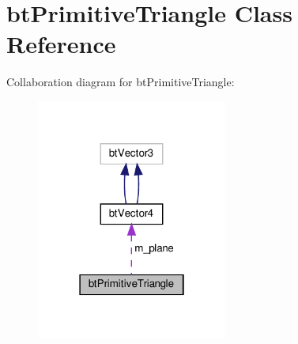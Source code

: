\hypertarget{classbtPrimitiveTriangle}{}\section{bt\+Primitive\+Triangle Class Reference}
\label{classbtPrimitiveTriangle}


Collaboration diagram for bt\+Primitive\+Triangle\+:
\nopagebreak
\begin{figure}[H]
\begin{center}
\leavevmode
\includegraphics[width=178pt]{classbtPrimitiveTriangle__coll__graph}
\end{center}
\end{figure}
